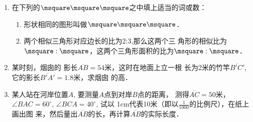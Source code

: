 \begin{ex}
\begin{enumerate}
	\item 在下列的$\msquare \msquare \msquare $之中填上适当的词或数：
\begin{enumerate}
\item 形状相同的图形叫做$\msquare \msquare \msquare $．
\item 两个相似三角形对应边长的比为2:3,那么这两个三
	角形的相似比为$\msquare : \msquare $，这两个三角形面积的比为$\msquare : \msquare $．
\end{enumerate}

	\item 某时刻，烟囱的
	影长$\overline{AB}=54$米，这时在地面上立一根
	长为2米的竹竿$\overline{B'C'}$, 它的影长$\overline{B'A'}=1.8$米，求烟囱
	的高．
	\item 某人站在河岸位置$A$, 要测量$A$点到对岸$B$点的距离，
	测得$\overline{AC}=50$米，$\angle BAC=60^{\circ}$, $\angle BCA=40^{\circ}$, 试以
	1cm代表10米（即以$\frac{1}{1000}$的比例尺），在纸上画出图
	来，然后量出$\overline{AB}$的长，再计算$\overline{AB}$的实际长度．
\end{enumerate}
\end{ex}


